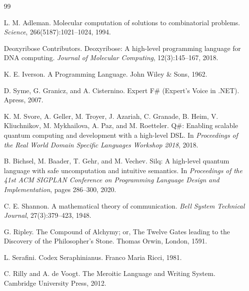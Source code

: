 \documentclass[11pt,a4paper]{article}
\begin{document}
\begin{thebibliography}{99}

L. M. Adleman.
\newblock Molecular computation of solutions to combinatorial problems.
\newblock \textit{Science}, 266(5187):1021--1024, 1994.

Deoxyribose Contributors.
\newblock Deoxyribose: A high-level programming language for DNA computing.
\newblock \textit{Journal of Molecular Computing}, 12(3):145--167, 2018.

K. E. Iverson.
\newblock A Programming Language.
\newblock John Wiley \& Sons, 1962.

D. Syme, G. Granicz, and A. Cisternino.
\newblock Expert F\# (Expert's Voice in .NET).
\newblock Apress, 2007.

K. M. Svore, A. Geller, M. Troyer, J. Azariah, C. Granade, B. Heim, V. Kliuchnikov, M. Mykhailova, A. Paz, and M. Roetteler.
\newblock Q\#: Enabling scalable quantum computing and development with a high-level DSL.
\newblock In \textit{Proceedings of the Real World Domain Specific Languages Workshop 2018}, 2018.

B. Bichsel, M. Baader, T. Gehr, and M. Vechev.
\newblock Silq: A high-level quantum language with safe uncomputation and intuitive semantics.
\newblock In \textit{Proceedings of the 41st ACM SIGPLAN Conference on Programming Language Design and Implementation}, pages 286--300, 2020.

C. E. Shannon.
\newblock A mathematical theory of communication.
\newblock \textit{Bell System Technical Journal}, 27(3):379--423, 1948.

G. Ripley.
\newblock The Compound of Alchymy; or, The Twelve Gates leading to the Discovery of the Philosopher's Stone.
\newblock Thomas Orwin, London, 1591.

L. Serafini.
\newblock Codex Seraphinianus.
\newblock Franco Maria Ricci, 1981.

C. Rilly and A. de Voogt.
\newblock The Meroitic Language and Writing System.
\newblock Cambridge University Press, 2012.

\end{thebibliography}
\end{document}
